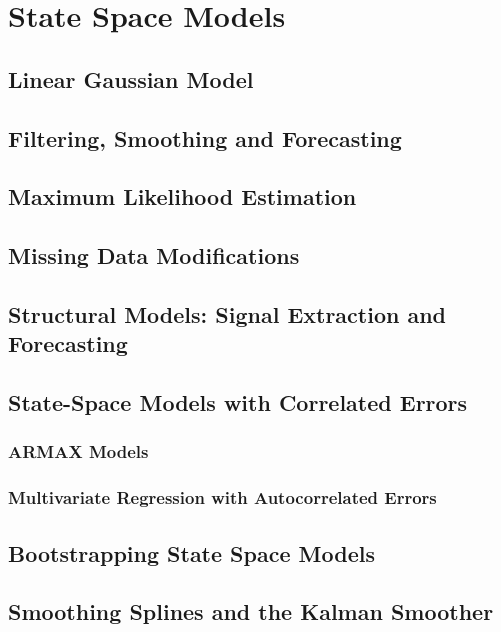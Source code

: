 \documentclass[12pt]{article}
\begin{document}
\section{State Space Models}
\subsection{Linear Gaussian Model}

\subsection{Filtering, Smoothing and Forecasting}

\subsection{Maximum Likelihood Estimation}

\subsection{Missing Data Modifications}

\subsection{Structural Models: Signal Extraction and Forecasting}

\subsection{State-Space Models with Correlated Errors}
\subsubsection{ARMAX Models}

\subsubsection{Multivariate Regression with Autocorrelated Errors}

\subsection{Bootstrapping State Space Models}

\subsection{Smoothing Splines and the Kalman Smoother}
\end{document}

